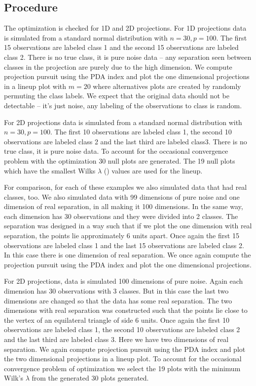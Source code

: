 \documentclass[12]{report}
\begin{document}
\subsection{Procedure}

The optimization is checked for 1D and 2D projections. For 1D projections data is simulated from a standard normal distribution with $n=30, p=100$. The first 15 observations are labeled class 1 and the second 15 observations are labeled class 2. There is no true class, it is pure noise data -- any separation seen between classes in the projection are purely due to the high dimension. We compute projection pursuit using the PDA index and plot the one dimensional projections in a lineup plot with $m=20$ where alternatives plots are created by randomly permuting the class labels. We expect that the original data should not be detectable -- it's just noise, any labeling of the observations to class is random. 

For 2D projections data is simulated from a standard normal distribution with $n=30, p=100$. The first 10 observations are labeled class 1, the second 10 observations are labeled class 2 and the last third are labeled class3. There is no true class, it is pure noise data. To account for the occasional convergence problem with the optimization 30 null plots are generated. The 19 null plots which have the smallest Wilks $\lambda$ (\cite{JW02}) values are used for the lineup. 

For comparison, for each of these examples we also simulated data that had real classes, too. We also simulated data with 99 dimensions of pure noise and one dimension of real separation, in all making it 100 dimensions. In the same way, each dimension has 30 observations and they were divided into 2 classes. The separation was designed in a way such that if we plot the one dimension with real separation, the points lie approximately 6 units apart. Once again the first 15 observations are labeled class 1 and the last 15 observations are labeled class 2. In this case there is one dimension of real separation. We once again compute the projection pursuit using the PDA index and plot the one dimensional projections.

For 2D projections, data is simulated 100 dimensions of pure noise. Again each dimension has 30 observations with 3 classes. But in this case the last two dimensions are changed so that the data has some real separation. The two dimensions with real separation was constructed such that the points lie close to the vertex of an equilateral triangle of side 6 units. Once again the first 10 observations are labeled class 1, the second 10 observations are labeled class 2 and the last third are labeled class 3. Here we have two dimensions of real separation. We again compute projection pursuit using the PDA index and plot the two dimensional projections in a lineup plot.  To account for the occasional convergence problem of optimization we select the 19 plots with the minimum Wilk's $\lambda$ from the generated 30 plots generated.
\end{document}

